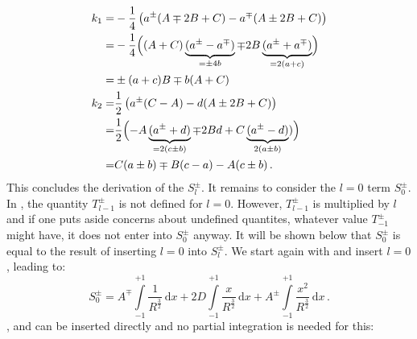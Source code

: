 \begin{align}
  k_1 =& -\frac{1}{4} \left( a^{\pm} (A \mp 2 B + C) - a^{\mp} (A \pm 2B + C) \right) \nonumber \\
  ~   =& -\frac{1}{4} \Bigl( (A+C) \underbrace{(a^{\pm} - a^{\mp})}_{=\pm 4b} \mp 2B \underbrace{(a^{\pm} + a^{\mp})}_{=2(a+c)} \Bigr) \nonumber \\
  ~   =& \pm (a+c) B \mp b(A+C) \label{eqn:k1_result} \\
  k_2 =& \frac{1}{2} \left( a^{\pm} (C-A) - d (A \pm 2B + C) \right) \nonumber \\
  ~   =& \frac{1}{2} \Bigl(-A \underbrace{(a^{\pm}+d)}_{=2(c \pm b)} \mp 2B d + C\underbrace{(a^{\pm}-d)}_{2(a \pm b)}) \Bigr) \nonumber \\
  ~   =& C (a \pm b) \mp B (c-a) - A (c \pm b) \, .
\end{align}
This concludes the derivation of the $S^{\pm}_l$.
It remains to consider the $l=0$ term $S^{\pm}_0$.
In , the quantity $T^{\pm}_{l-1}$ is not defined for $l=0$.
However, $T^{\pm}_{l-1}$ is multiplied by $l$ and if one puts aside concerns about undefined quantites, whatever value $T^{\pm}_{-1}$ might have,
it does not enter into $S^{\pm}_0$ anyway.
It will be shown below that $S^{\pm}_0$ is equal to the result of inserting $l=0$ into $S^{\pm}_l$.
We start again with  and insert $l=0$, leading to:
\begin{equation}
  S^{\pm}_0
  = A^{\mp} \int\limits_{-1}^{+1}
              \frac{1}{R^{\frac{3}{2}}} \,\mathrm{d}x
  + 2 D     \int\limits_{-1}^{+1}
              \frac{x}{R^{\frac{3}{2}}} \,\mathrm{d}x
  + A^{\pm} \int\limits_{-1}^{+1}
              \frac{x^2}{R^{\frac{3}{2}}} \,\mathrm{d}x \, .
\end{equation}
,  and 
can be inserted directly and no partial integration is needed for this:
